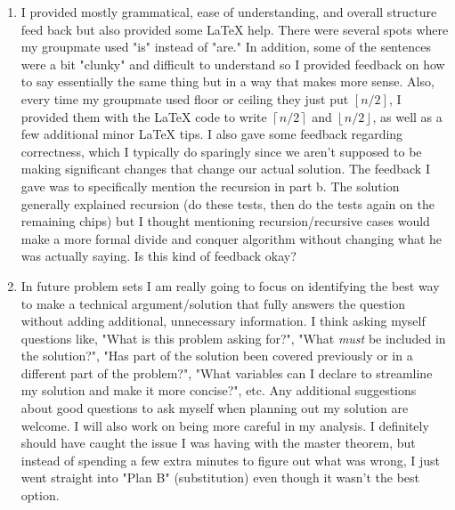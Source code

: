 \documentclass[11pt]{article}
\theoremstyle{nonumberplain}
\begin{document}
\begin{enumerate}
\item I provided mostly grammatical, ease of understanding, and overall structure feed back but also provided some \LaTeX{} help. There were several spots where my groupmate used "is" instead of "are." In addition, some of the sentences were a bit "clunky" and difficult to understand so I provided feedback on how to say essentially the same thing but in a way that makes more sense. Also, every time my groupmate used floor or ceiling they just put $[n/2]$, I provided them with the \LaTeX{} code to write $\left \lceil{n/2} \right \rceil$ and $\left \lfloor{n/2} \right \rfloor$, as well as a few additional minor \LaTeX{} tips. I also gave some feedback regarding correctness, which I typically do sparingly since we aren't supposed to be making significant changes that change our actual solution. The feedback I gave was to specifically mention the recursion in part b. The solution generally explained recursion (do these tests, then do the tests again on the remaining chips) but I thought mentioning recursion/recursive cases would make a more formal divide and conquer algorithm without changing what he was actually saying. Is this kind of feedback okay?    
\item In future problem sets I am really going to focus on identifying the best way to make a technical argument/solution that fully answers the question without adding additional, unnecessary information. I think asking myself questions like, "What is this problem asking for?", "What \emph{must} be included in the solution?", "Has part of the solution been covered previously or in a different part of the problem?", "What variables can I declare to streamline my solution and make it more concise?", etc. Any additional suggestions about good questions to ask myself when planning out my solution are welcome. I will also work on being more careful in my analysis. I definitely should have caught the issue I was having with the master theorem, but instead of spending a few extra minutes to figure out what was wrong, I just went straight into "Plan B" (substitution) even though it wasn't the best option.   
\end{enumerate}
\end{document}
